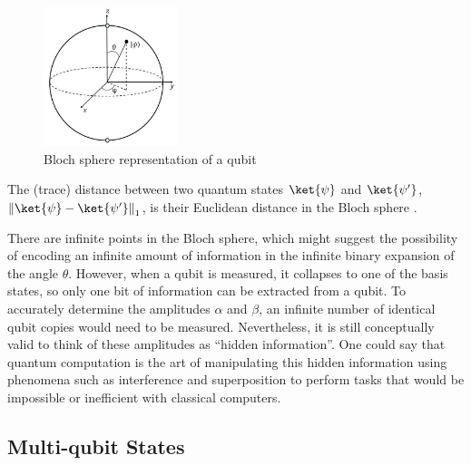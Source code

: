  
\begin{figure}[H] 
  \centering
  \includegraphics[width=0.35\textwidth]{images/bloch_sphere.jpg}
  \caption{Bloch sphere representation of a qubit}
  \label{fig:bloch_sphere}
\end{figure}

The (trace) distance between two quantum states $\ket{\psi}$ and $\ket{\psi'}$, $\tracenorm{\ket{\psi}-\ket{\psi'}}$, is their Euclidean distance in the Bloch sphere \cite{nielsen2010quantum}. 

There are infinite points in the Bloch sphere, which might suggest the possibility of encoding an infinite amount of information in the infinite binary expansion of the angle $\theta$. However, when a qubit is measured, it collapses to one of the basis states, so only one bit of information can be extracted from a qubit. To accurately determine the amplitudes $\alpha$ and $\beta$, an infinite number of identical qubit copies would need to be measured. Nevertheless, it is still conceptually valid to think of these amplitudes as ``hidden information''. One could say that quantum computation is the art of manipulating this hidden information using phenomena such as interference and superposition to perform tasks that would be impossible or inefficient with classical computers.



\subsection{Multi-qubit States} \label{subsec:entanglement}

